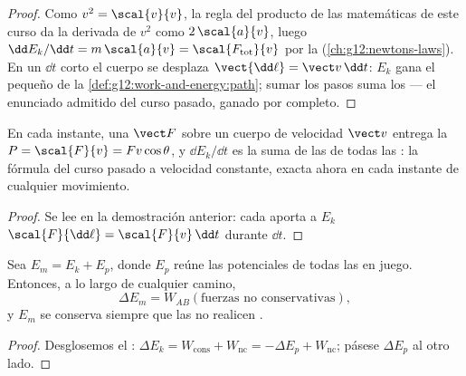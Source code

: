 \begin{proof}
Como $v^2 = \scal{v}{v}$, la regla del producto de las matemáticas de este curso da la
derivada de $v^2$ como $2\,\scal{a}{v}$, luego
$\dd E_k/\dd t = m\,\scal{a}{v} = \scal{F_{\text{tot}}}{v}$ por la  (\cref{ch:g12:newtons-laws}). En un $\dd t$ corto el cuerpo se desplaza
$\vect{\dd\ell} = \vect v\,\dd t$: $E_k$ gana el pequeño  de la
\cref{def:g12:work-and-energy:path}; sumar los pasos suma los  --- el
enunciado admitido del curso pasado, ganado por completo.
\end{proof}

\begin{proposition}\label{prop:g12:work-and-energy:power}
En cada instante, una  $\vect F$ sobre un cuerpo de velocidad $\vect v$ entrega
la  $P = \scal{F}{v} = Fv\cos\theta$, y $\dd E_k/\dd t$ es la suma de las
 de todas las : la fórmula del curso pasado a velocidad constante,
exacta ahora en cada instante de cualquier movimiento.
\end{proposition}

\begin{proof}
Se lee en la demostración anterior: cada  aporta a $E_k$
$\scal{F}{\dd\ell} = \scal{F}{v}\,\dd t$ durante $\dd t$.
\end{proof}

\begin{theorem}\label{thm:g12:work-and-energy:emtheorem}
Sea $E_m = E_k + E_p$, donde $E_p$ reúne las  potenciales de todas las  en juego. Entonces, a lo largo de cualquier camino,
\[
\Delta E_m = W_{AB}(\text{fuerzas no conservativas}),
\]
y $E_m$ se conserva siempre que las  no realicen .
\end{theorem}

\begin{proof}
Desglosemos el :
$\Delta E_k = W_{\text{cons}} + W_{\text{nc}} = -\Delta E_p + W_{\text{nc}}$; pásese
$\Delta E_p$ al otro lado.
\end{proof}


